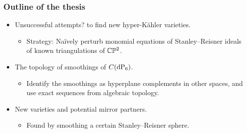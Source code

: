 \begin{frame}
\frametitle{Outline of the thesis}

\begin{itemize}
    \item
    Unsuccessful attempt\alert{s?} to find new hyper-Kähler varieties.
    \begin{itemize}
        \item
	Strategy: Naïvely perturb monomial equations of Stanley--Reisner ideals of known triangulations of $\mathbb{C} \mathbb{P}^2$.
    \end{itemize}

    \item
    The topology of smoothings of $C(\dP6)$.
    \begin{itemize}
        \item
        Identify the smoothings as hyperplane complements in other spaces, and use exact sequences from algebraic topology.
    \end{itemize}

    \item
    New \CY varieties and potential mirror partners.
    \begin{itemize}
        \item
        Found by smoothing a certain Stanley--Reisner sphere.
    \end{itemize}
\end{itemize}

\end{frame}
